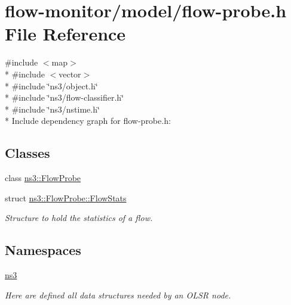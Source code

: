 \hypertarget{flow-probe_8h}{}\section{flow-\/monitor/model/flow-\/probe.h File Reference}
\label{flow-probe_8h}
{\ttfamily \#include $<$map$>$}\\*
{\ttfamily \#include $<$vector$>$}\\*
{\ttfamily \#include \char`\"{}ns3/object.\+h\char`\"{}}\\*
{\ttfamily \#include \char`\"{}ns3/flow-\/classifier.\+h\char`\"{}}\\*
{\ttfamily \#include \char`\"{}ns3/nstime.\+h\char`\"{}}\\*
Include dependency graph for flow-\/probe.h\+:
\subsection*{Classes}
\begin{DoxyCompactItemize}
\item 
class \hyperlink{classns3_1_1FlowProbe}{ns3\+::\+Flow\+Probe}
\item 
struct \hyperlink{structns3_1_1FlowProbe_1_1FlowStats}{ns3\+::\+Flow\+Probe\+::\+Flow\+Stats}
\begin{DoxyCompactList}\small\item\em Structure to hold the statistics of a flow. \end{DoxyCompactList}\end{DoxyCompactItemize}
\subsection*{Namespaces}
\begin{DoxyCompactItemize}
\item 
 \hyperlink{namespacens3}{ns3}
\begin{DoxyCompactList}\small\item\em Here are defined all data structures needed by an O\+L\+SR node. \end{DoxyCompactList}\end{DoxyCompactItemize}
